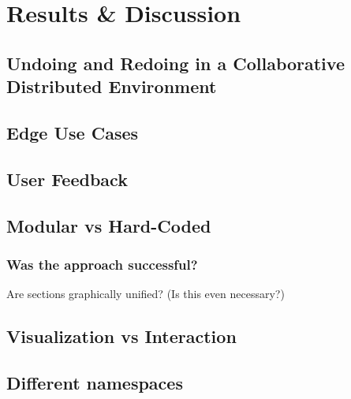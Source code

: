 \chapter{Results \& Discussion}

\section{Undoing and Redoing in a Collaborative Distributed Environment}

\section{Edge Use Cases}

\section{User Feedback}

\section{Modular vs Hard-Coded}
\subsection{Was the approach successful?}
Are sections graphically unified? (Is this even necessary?)
	
\section{Visualization vs Interaction}

\section{Different namespaces}